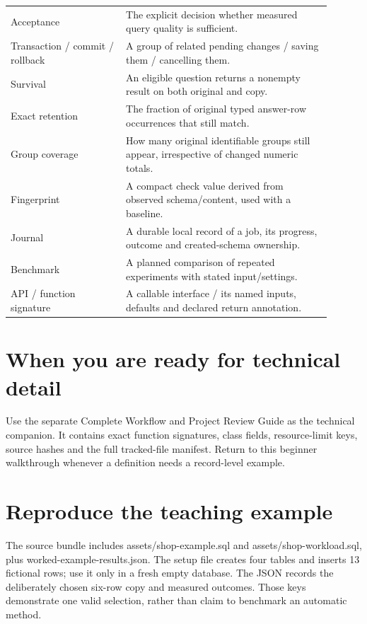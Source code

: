 \begin{longtable}{>{\RaggedRight\arraybackslash}p{0.32\linewidth}>{\RaggedRight\arraybackslash}p{0.58\linewidth}}
Acceptance & The explicit decision whether measured query quality is sufficient. \\[5pt]
Transaction / commit / rollback & A group of related pending changes / saving them / cancelling them. \\[5pt]
Survival & An eligible question returns a nonempty result on both original and copy. \\[5pt]
Exact retention & The fraction of original typed answer-row occurrences that still match. \\[5pt]
Group coverage & How many original identifiable groups still appear, irrespective of changed numeric totals. \\[5pt]
Fingerprint & A compact check value derived from observed schema/content, used with a baseline. \\[5pt]
Journal & A durable local record of a job, its progress, outcome and created-schema ownership. \\[5pt]
Benchmark & A planned comparison of repeated experiments with stated input/settings. \\[5pt]
API / function signature & A callable interface / its named inputs, defaults and declared return annotation. \\[5pt]
\bottomrule
\end{longtable}

\section{When you are ready for technical detail}

Use the separate Complete Workflow and Project Review Guide as the technical companion. It contains exact function signatures, class fields, resource-limit keys, source hashes and the full tracked-file manifest. Return to this beginner walkthrough whenever a definition needs a record-level example.

\section{Reproduce the teaching example}

The source bundle includes assets/shop-example.sql and assets/shop-workload.sql, plus worked-example-results.json. The setup file creates four tables and inserts 13 fictional rows; use it only in a fresh empty database. The JSON records the deliberately chosen six-row copy and measured outcomes. Those keys demonstrate one valid selection, rather than claim to benchmark an automatic method.

